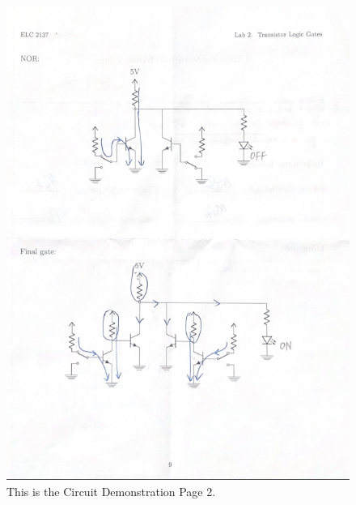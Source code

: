\documentclass[11pt]{article}
\begin{document}
	\begin{figure}[ht]\centering
		\includegraphics[width=1\textwidth]{Lab2Page2}
		\caption{This is the Circuit Demonstration Page 2.}
		\label{fig:original_logo}
	\end{figure}
	
\end{document}
